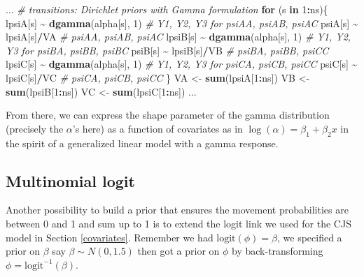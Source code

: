 \documentclass[
  12pt,
]{krantz}
\newenvironment{Shaded}{\begin{snugshade}}{\end{snugshade}}
\newcommand{\CommentTok}[1]{\textcolor[rgb]{0.56,0.35,0.01}{\textit{#1}}}
\newcommand{\ControlFlowTok}[1]{\textcolor[rgb]{0.13,0.29,0.53}{\textbf{#1}}}
\newcommand{\DecValTok}[1]{\textcolor[rgb]{0.00,0.00,0.81}{#1}}
\newcommand{\FunctionTok}[1]{\textcolor[rgb]{0.13,0.29,0.53}{\textbf{#1}}}
\newcommand{\NormalTok}[1]{#1}
\newcommand{\OtherTok}[1]{\textcolor[rgb]{0.56,0.35,0.01}{#1}}
\newcommand{\SpecialCharTok}[1]{\textcolor[rgb]{0.81,0.36,0.00}{\textbf{#1}}}
\begin{document}
\begin{Shaded}
\begin{Highlighting}[]
\NormalTok{...}
\CommentTok{\# transitions: Dirichlet priors with Gamma formulation}
\ControlFlowTok{for}\NormalTok{ (s }\ControlFlowTok{in} \DecValTok{1}\SpecialCharTok{:}\NormalTok{ns)\{}
\NormalTok{  lpsiA[s] }\SpecialCharTok{\textasciitilde{}} \FunctionTok{dgamma}\NormalTok{(alpha[s], }\DecValTok{1}\NormalTok{) }\CommentTok{\# Y1, Y2, Y3 for psiAA, psiAB, psiAC}
\NormalTok{  psiA[s] }\SpecialCharTok{\textasciitilde{}}\NormalTok{ lpsiA[s]}\SpecialCharTok{/}\NormalTok{VA }\CommentTok{\# psiAA, psiAB, psiAC}
\NormalTok{  lpsiB[s] }\SpecialCharTok{\textasciitilde{}} \FunctionTok{dgamma}\NormalTok{(alpha[s], }\DecValTok{1}\NormalTok{) }\CommentTok{\# Y\textquotesingle{}1, Y\textquotesingle{}2, Y\textquotesingle{}3 for psiBA, psiBB, psiBC}
\NormalTok{  psiB[s] }\SpecialCharTok{\textasciitilde{}}\NormalTok{ lpsiB[s]}\SpecialCharTok{/}\NormalTok{VB }\CommentTok{\# psiBA, psiBB, psiCC}
\NormalTok{  lpsiC[s] }\SpecialCharTok{\textasciitilde{}} \FunctionTok{dgamma}\NormalTok{(alpha[s], }\DecValTok{1}\NormalTok{) }\CommentTok{\# Y\textquotesingle{}\textquotesingle{}1, Y\textquotesingle{}\textquotesingle{}2, Y\textquotesingle{}\textquotesingle{}3 for psiCA, psiCB, psiCC}
\NormalTok{  psiC[s] }\SpecialCharTok{\textasciitilde{}}\NormalTok{ lpsiC[s]}\SpecialCharTok{/}\NormalTok{VC }\CommentTok{\# psiCA, psiCB, psiCC}
\NormalTok{\}}
\NormalTok{VA }\OtherTok{\textless{}{-}} \FunctionTok{sum}\NormalTok{(lpsiA[}\DecValTok{1}\SpecialCharTok{:}\NormalTok{ns])}
\NormalTok{VB }\OtherTok{\textless{}{-}} \FunctionTok{sum}\NormalTok{(lpsiB[}\DecValTok{1}\SpecialCharTok{:}\NormalTok{ns])}
\NormalTok{VC }\OtherTok{\textless{}{-}} \FunctionTok{sum}\NormalTok{(lpsiC[}\DecValTok{1}\SpecialCharTok{:}\NormalTok{ns])}
\NormalTok{...}
\end{Highlighting}
\end{Shaded}

From there, we can express the shape parameter of the gamma distribution (precisely the \(\alpha\)'s here) as a function of covariates as in \(\log(\alpha) = \beta_1 + \beta_2 x\) in the spirit of a generalized linear model with a gamma response.

\hypertarget{multinomial-logit}{%
\subsection{Multinomial logit}\label{multinomial-logit}}

Another possibility to build a prior that ensures the movement probabilities are between 0 and 1 and sum up to 1 is to extend the logit link we used for the CJS model in Section \ref{covariates}. Remember we had \(\text{logit}(\phi) = \beta\), we specified a prior on \(\beta\) say \(\beta \sim N(0,1.5)\) then got a prior on \(\phi\) by back-transforming \(\phi = \text{logit}^{-1}(\beta)\).
\end{document}
